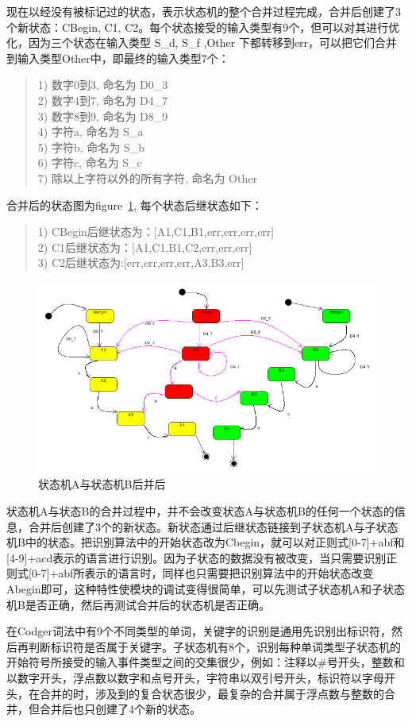 现在以经没有被标记过的状态，表示状态机的整个合并过程完成，合并后创建了3个新状态：CBegin, C1, C2。每个状态接受的输入类型有9个，但可以对其进行优化，因为三个状态在输入类型 S\_d, S\_f ,Other 下都转移到err，可以把它们合并到输入类型Other中，即最终的输入类型7个：
\begin{quote}
1) 数字0到3, 命名为 D0\_3 \\
2) 数字4到7, 命名为 D4\_7 \\
3) 数字8到9, 命名为 D8\_9 \\
4) 字符a,  命名为 S\_a \\
5) 字符b,  命名为 S\_b \\
6) 字符c,  命名为 S\_c \\
7) 除以上字符以外的所有字符, 命名为 Other
\end{quote}
合并后的状态图为figure~\ref{fig:state_c}, 每个状态后继状态如下：
\begin{quote}
1) CBegin后继状态为：[A1,C1,B1,err,err,err,err]  \\
2) C1后继状态为：[A1,C1,B1,C2,err,err,err] \\
3) C2后继状态为:[err,err,err,err,A3,B3,err] 
\end{quote}
\begin{figure}
\centering
\includegraphics[scale=0.8,angle=90]{s_c.png}
\caption{状态机A与状态机B后并后}
\label{fig:state_c}
\end{figure}
状态机A与状态B的合并过程中，并不会改变状态A与状态机B的任何一个状态的信息，合并后创建了3个的新状态。新状态通过后继状态链接到子状态机A与子状态机B中的状态。把识别算法中的开始状态改为Cbegin，就可以对正则式[0-7]+abf和[4-9]+acd表示的语言进行识别。因为子状态的数据没有被改变，当只需要识别正则式[0-7]+abf所表示的语言时，同样也只需要把识别算法中的开始状态改变Abegin即可，这种特性使模块的调试变得很简单，可以先测试子状态机A和子状态机B是否正确，然后再测试合并后的状态机是否正确。

在Codger词法中有9个不同类型的单词，关键字的识别是通用先识别出标识符，然后再判断标识符是否属于关键字。子状态机有8个，识别每种单词类型子状态机的开始符号所接受的输入事件类型之间的交集很少，例如：注释以\#号开头，整数和以数字开头，浮点数以数字和点号开头，字符串以双引号开头，标识符以字母开头，在合并的时，涉及到的复合状态很少，最复杂的合并属于浮点数与整数的合并，但合并后也只创建了4个新的状态。

